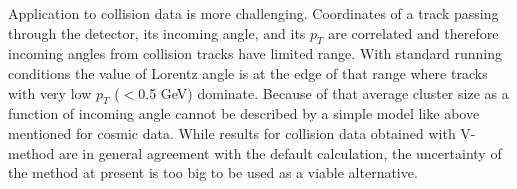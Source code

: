 Application to collision data is more challenging. Coordinates of a track passing through the detector, its incoming angle, and its $p_T$ are
correlated and therefore incoming angles from collision tracks have limited range. With
standard running conditions the value of Lorentz angle is at the edge of that range where tracks with very low $p_T$ ($<$0.5 GeV) dominate. Because
of that average cluster size as a function of incoming angle cannot be described by a simple model like above mentioned for cosmic data.
While  results for collision data obtained with V-method are in general agreement with the default calculation,  the uncertainty of
the method at present is too big to be used as a viable alternative.

